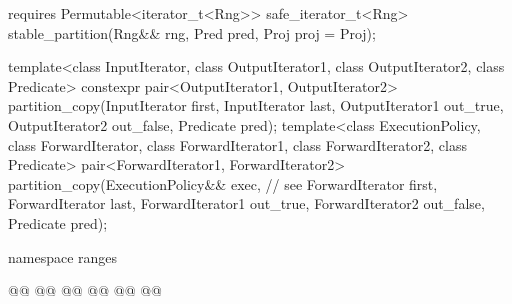 \begin{addedblock}
\begin{codeblock}
{      requires Permutable<iterator_t<Rng>>
      safe_iterator_t<Rng> stable_partition(Rng&& rng, Pred pred, Proj proj = Proj{});
  }
\end{codeblock}\end{addedblock}\begin{codeblock}
  template<class InputIterator, class OutputIterator1,
           class OutputIterator2, class Predicate>
    constexpr pair<OutputIterator1, OutputIterator2>
      partition_copy(InputIterator first, InputIterator last,
                     OutputIterator1 out_true, OutputIterator2 out_false,
                     Predicate pred);
  template<class ExecutionPolicy, class ForwardIterator, class ForwardIterator1,
           class ForwardIterator2, class Predicate>
    pair<ForwardIterator1, ForwardIterator2>
      partition_copy(ExecutionPolicy&& exec, // see 
                     ForwardIterator first, ForwardIterator last,
                     ForwardIterator1 out_true, ForwardIterator2 out_false,
                     Predicate pred);
\end{codeblock}\begin{addedblock}\begin{codeblock}
  namespace ranges {
    @@
    @@
      @@
      @@
      @@
    @\newtxt{\};}@

}
\end{codeblock}
\end{addedblock}
